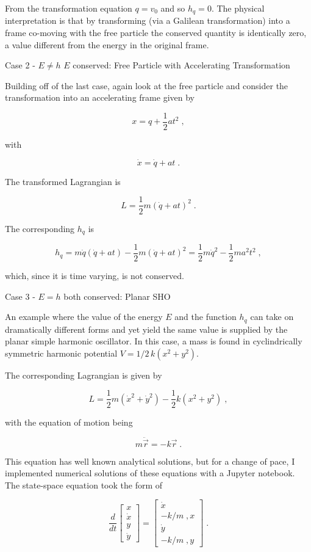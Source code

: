 \documentclass[12pt]{article}
\begin{document}
From the transformation equation $q = v_0$ and so $h_q = 0$. The physical interpretation is that by transforming (via a Galilean transformation) into a frame co-moving with the free particle the conserved quantity is identically zero, a value different from the energy in the original frame.

Case 2 - $E \neq h$ $E$ conserved:  Free Particle with Accelerating Transformation

Building off of the last case, again look at the free particle and consider the transformation into an accelerating frame given by

\[ x = q + \frac{1}{2} a t^2 \; ,\]

with

\[ \dot x = \dot q + a t \; .\]

The transformed Lagrangian is 

\[ L = \frac{1}{2} m \left( \dot q + a t \right) ^2 \; . \]

The corresponding $h_q$ is 

\[ h_q = m \dot q (\dot q + a t) - \frac{1}{2} m \left(\dot q + a t \right)^2  = \frac{1}{2} m \dot q^2 - \frac{1}{2} m a^2 t^2  \; , \]

which, since it is time varying, is not conserved.


Case 3 - $E = h$ both conserved: Planar SHO

An example where the value of the energy $E$ and the function $h_q$ can take on dramatically different forms and yet yield the same value is supplied by the planar simple harmonic oscillator.  In this case, a mass is found in cyclindrically symmetric harmonic potential $V = 1/2 \, k(x^2 + y^2)$.

The corresponding Lagrangian is given by 

\[ L = \frac{1}{2} m \left( {\dot x}^2 + {\dot y}^2 \right) - \frac{1}{2} k \left( x^2 + y^2 \right) \; , \]

with the equation of motion being 

\[  m \ddot {\vec r} = -k \vec r \; .\]

This equation has well known analytical solutions, but for a change of pace, I implemented numerical solutions of these equations with a Jupyter notebook.  The state-space equation took the form of

\[  \frac{d}{dt} \left[ \begin{array}{c} x \\ \dot x \\ y \\ \dot y \end{array} \right] = \left[ \begin{array}{c} \dot x \\ - k/m \; , x \\ \dot y \\ -k/m \; , y \end{array} \right] \; . \]
\end{document}
